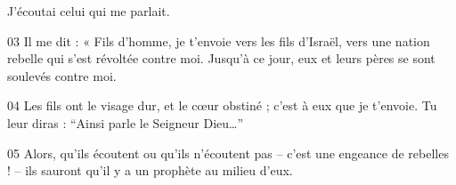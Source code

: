 J’écoutai celui qui me parlait.

03 Il me dit : « Fils d’homme, je t’envoie vers les fils d’Israël, vers une nation rebelle qui s’est révoltée contre moi. Jusqu’à ce jour, eux et leurs pères se sont soulevés contre moi.

04 Les fils ont le visage dur, et le cœur obstiné ; c’est à eux que je t’envoie. Tu leur diras : “Ainsi parle le Seigneur Dieu…”

05 Alors, qu’ils écoutent ou qu’ils n’écoutent pas – c’est une engeance de rebelles ! – ils sauront qu’il y a un prophète au milieu d’eux.
